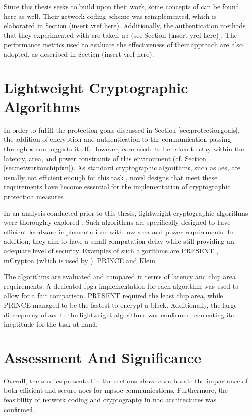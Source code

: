 Since this thesis seeks to build upon their work, some concepts of \citeauthor{moriam18activeattackers} can be found here as well. Their network coding
scheme was reimplemented, which is elaborated in Section (insert vref here). Additionally, the authentication methods that they experimented with
are taken up (see Section (insert vref here)). The performance metrics used to evaluate the effectiveness of their approach are also adopted, as
described in Section (insert vref here).

\section{Lightweight Cryptographic Algorithms}\label{sec:lightweightcrypto}
In order to fulfill the protection goals discussed in Section \ref{sec:protectiongoals}, the addition of encryption and authentication to
the communication passing through a \gls{noc} suggests itself. However, care needs to be taken to stay within the latency, area, and power constraints
of this environment (cf. Section \ref{sec:networkonchipfun}). As standard cryptographic algorithms, such as \gls{aes}, are usually not efficient
enough for this task \cite[1]{bogdanov07present}, novel designs that meet these requirements have become essential for the implementation of
cryptographic protection measures.

In an analysis conducted prior to this thesis, lightweight cryptographic algorithms were thoroughly explored \cite{harttung17lightweightcrypto}. Such
algorithms are
specifically designed to have efficient hardware implementations with low area and power requirements. In addition, they aim to have a small
computation delay while still providing an adequate level of security. Examples of such algorithms are PRESENT \cite{bogdanov07present},
mCrypton \cite{lim06mcrypton} (which is used by \citeauthor{moriam18activeattackers} \cite{moriam18activeattackers}), PRINCE \cite{borghoff12prince}
and Klein \cite{gong12klein}.

The algorithms are evaluated and compared in terms of latency and chip area requirements. A dedicated \gls{fpga} implementation for each algorithm
was used to allow for a fair comparison. PRESENT required the least chip area, while PRINCE managed to be the fastest to encrypt a block.
Additionally, the large discrepancy of \gls{aes} to the lightweight algorithms was confirmed, cementing its ineptitude for the task at hand.

\section{Assessment And Significance}
Overall, the studies presented in the sections above corroborate the importance of both efficient and secure \glspl{noc} for \gls{mpsoc}
communications. Furthermore, the feasibility of network coding and cryptography in \gls{noc} architectures was confirmed.

